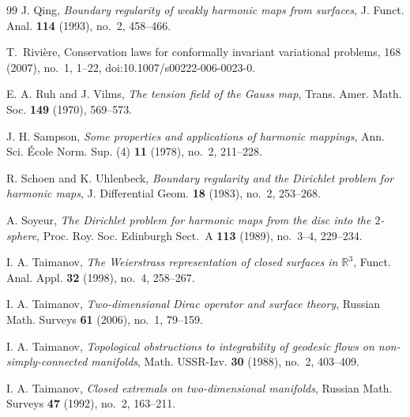 \documentclass[11pt]{amsart}
\numberwithin{equation}{section}
\theoremstyle{remark}
\begin{document}
\begin{thebibliography}{99}
J. Qing,
\emph{Boundary regularity of weakly harmonic maps from surfaces},
J. Funct. Anal. \textbf{114} (1993), no.~2, 458--466.


T.~Rivi\`ere,
\newblock Conservation laws for conformally invariant variational problems,
 168 (2007), no.~1, 1--22,
\newblock doi:10.1007/s00222-006-0023-0.


E. A. Ruh and J. Vilms,
\emph{The tension field of the Gauss map},
Trans. Amer. Math. Soc. \textbf{149} (1970), 569--573.


J. H. Sampson,
\emph{Some properties and applications of harmonic mappings},
Ann. Sci. \'Ecole Norm. Sup. (4) \textbf{11} (1978), no.~2, 211--228.

R. Schoen and K. Uhlenbeck,
\emph{Boundary regularity and the Dirichlet problem for harmonic maps},
J. Differential Geom. \textbf{18} (1983), no.~2, 253--268.

A. Soyeur,
\emph{The Dirichlet problem for harmonic maps from the disc into the $2$-sphere},
Proc. Roy. Soc. Edinburgh Sect.~A \textbf{113} (1989), no.~3--4, 229--234.

I. A. Taimanov,
\emph{The Weierstrass representation of closed surfaces in $\mathbb R^3$},
Funct. Anal. Appl. \textbf{32} (1998), no.~4, 258--267.

I. A. Taimanov,
\emph{Two-dimensional Dirac operator and surface theory},
Russian Math. Surveys \textbf{61} (2006), no.~1, 79--159.

I. A. Taimanov,
\emph{Topological obstructions to integrability of geodesic flows on non-simply-connected manifolds},
Math. USSR-Izv. \textbf{30} (1988), no.~2, 403--409.

I. A. Taimanov,
\emph{Closed extremals on two-dimensional manifolds},
Russian Math. Surveys \textbf{47} (1992), no.~2, 163--211.

\end{thebibliography}
\end{document}
